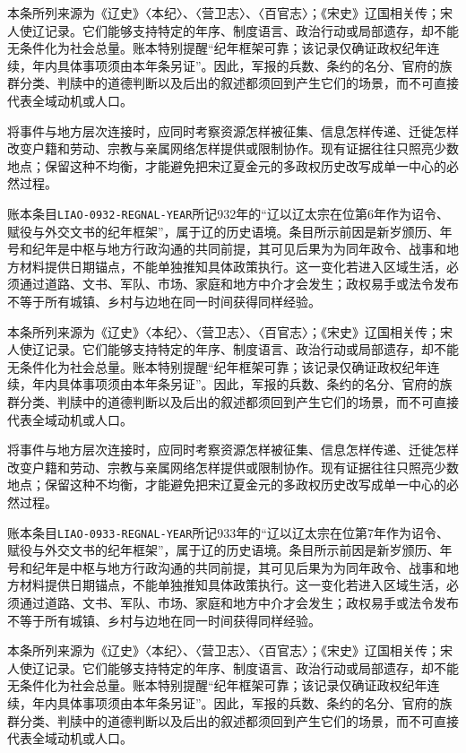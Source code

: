 本条所列来源为《辽史》〈本纪〉、〈营卫志〉、〈百官志〉；《宋史》辽国相关传；宋人使辽记录。它们能够支持特定的年序、制度语言、政治行动或局部遗存，却不能无条件化为社会总量。账本特别提醒“纪年框架可靠；该记录仅确证政权纪年连续，年内具体事项须由本年条另证”。因此，军报的兵数、条约的名分、官府的族群分类、判牍中的道德判断以及后出的叙述都须回到产生它们的场景，而不可直接代表全域动机或人口。

将事件与地方层次连接时，应同时考察资源怎样被征集、信息怎样传递、迁徙怎样改变户籍和劳动、宗教与亲属网络怎样提供或限制协作。现有证据往往只照亮少数地点；保留这种不均衡，才能避免把宋辽夏金元的多政权历史改写成单一中心的必然过程。

账本条目\texttt{LIAO-0932-REGNAL-YEAR}所记932年的“辽以辽太宗在位第6年作为诏令、赋役与外交文书的纪年框架”，属于辽的历史语境。条目所示前因是新岁颁历、年号和纪年是中枢与地方行政沟通的共同前提，其可见后果为为同年政令、战事和地方材料提供日期锚点，不能单独推知具体政策执行。这一变化若进入区域生活，必须通过道路、文书、军队、市场、家庭和地方中介才会发生；政权易手或法令发布不等于所有城镇、乡村与边地在同一时间获得同样经验。

本条所列来源为《辽史》〈本纪〉、〈营卫志〉、〈百官志〉；《宋史》辽国相关传；宋人使辽记录。它们能够支持特定的年序、制度语言、政治行动或局部遗存，却不能无条件化为社会总量。账本特别提醒“纪年框架可靠；该记录仅确证政权纪年连续，年内具体事项须由本年条另证”。因此，军报的兵数、条约的名分、官府的族群分类、判牍中的道德判断以及后出的叙述都须回到产生它们的场景，而不可直接代表全域动机或人口。

将事件与地方层次连接时，应同时考察资源怎样被征集、信息怎样传递、迁徙怎样改变户籍和劳动、宗教与亲属网络怎样提供或限制协作。现有证据往往只照亮少数地点；保留这种不均衡，才能避免把宋辽夏金元的多政权历史改写成单一中心的必然过程。

账本条目\texttt{LIAO-0933-REGNAL-YEAR}所记933年的“辽以辽太宗在位第7年作为诏令、赋役与外交文书的纪年框架”，属于辽的历史语境。条目所示前因是新岁颁历、年号和纪年是中枢与地方行政沟通的共同前提，其可见后果为为同年政令、战事和地方材料提供日期锚点，不能单独推知具体政策执行。这一变化若进入区域生活，必须通过道路、文书、军队、市场、家庭和地方中介才会发生；政权易手或法令发布不等于所有城镇、乡村与边地在同一时间获得同样经验。

本条所列来源为《辽史》〈本纪〉、〈营卫志〉、〈百官志〉；《宋史》辽国相关传；宋人使辽记录。它们能够支持特定的年序、制度语言、政治行动或局部遗存，却不能无条件化为社会总量。账本特别提醒“纪年框架可靠；该记录仅确证政权纪年连续，年内具体事项须由本年条另证”。因此，军报的兵数、条约的名分、官府的族群分类、判牍中的道德判断以及后出的叙述都须回到产生它们的场景，而不可直接代表全域动机或人口。

